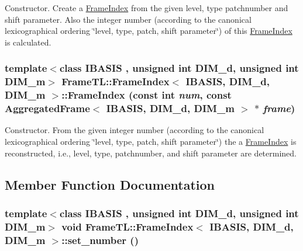 Constructor. Create a \hyperlink{classFrameTL_1_1FrameIndex}{FrameIndex} from the given level, type patchnumber and shift parameter. Also the integer number (according to the canonical lexicographical ordering \char`\"{}level, type, patch, shift parameter\char`\"{}) of this \hyperlink{classFrameTL_1_1FrameIndex}{FrameIndex} is calculated. \hypertarget{classFrameTL_1_1FrameIndex_a56610938bd08f42df14e503770a89d7}{
\subsubsection[{FrameIndex}]{\setlength{\rightskip}{0pt plus 5cm}template$<$class IBASIS , unsigned int DIM\_\-d, unsigned int DIM\_\-m$>$ {\bf FrameTL::FrameIndex}$<$ IBASIS, DIM\_\-d, DIM\_\-m $>$::{\bf FrameIndex} (const int {\em num}, \/  const {\bf AggregatedFrame}$<$ IBASIS, DIM\_\-d, DIM\_\-m $>$ $\ast$ {\em frame})}}
\label{classFrameTL_1_1FrameIndex_a56610938bd08f42df14e503770a89d7}


Constructor. From the given integer number (according to the canonical lexicographical ordering \char`\"{}level, type, patch, shift parameter\char`\"{}) the a \hyperlink{classFrameTL_1_1FrameIndex}{FrameIndex} is reconstructed, i.e., level, type, patchnumber, and shift parameter are determined. 

\subsection{Member Function Documentation}
\hypertarget{classFrameTL_1_1FrameIndex_e616e586eab66c5b4109f73dd5e11017}{
\subsubsection[{set\_\-number}]{\setlength{\rightskip}{0pt plus 5cm}template$<$class IBASIS , unsigned int DIM\_\-d, unsigned int DIM\_\-m$>$ void {\bf FrameTL::FrameIndex}$<$ IBASIS, DIM\_\-d, DIM\_\-m $>$::set\_\-number ()}}
\label{classFrameTL_1_1FrameIndex_e616e586eab66c5b4109f73dd5e11017}


